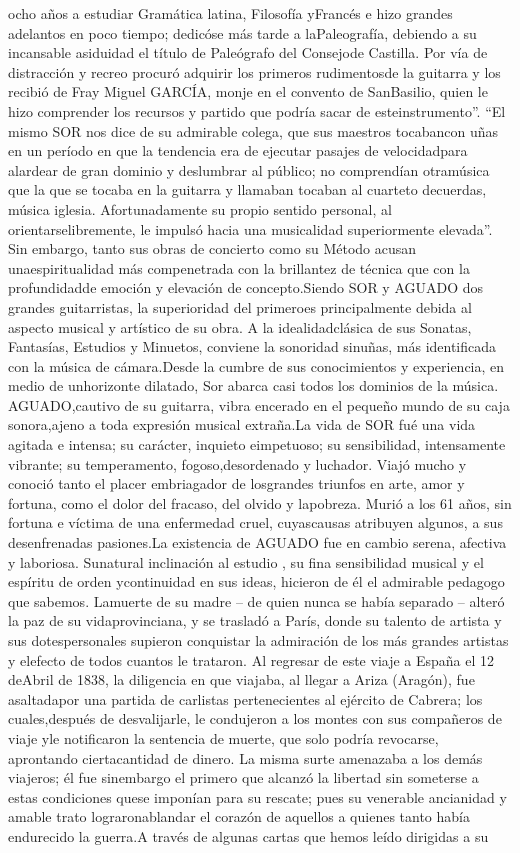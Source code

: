 \documentclass[
11pt, %
a4paper, %
oneside, %
headinclude,footinclude, %
BCOR5mm, %
]{scrartcl}
\begin{document}
{ocho años a estudiar Gramática latina, Filosofía yFrancés e hizo grandes adelantos en poco tiempo; dedicóse más tarde a laPaleografía, debiendo a su incansable asiduidad el título de Paleógrafo del Consejode Castilla. Por vía de distracción y recreo procuró adquirir los primeros rudimentosde la guitarra y los recibió de Fray Miguel GARCÍA, monje en el convento de SanBasilio, quien le hizo comprender los recursos y partido que podría sacar de esteinstrumento”. “El mismo SOR nos dice de su admirable colega, que sus maestros tocabancon uñas en un período en que la tendencia era de ejecutar pasajes de velocidadpara alardear de gran dominio y deslumbrar al público; no comprendían otramúsica que la que se tocaba en la guitarra y llamaban tocaban al cuarteto decuerdas, música iglesia. Afortunadamente su propio sentido personal, al orientarselibremente, le impulsó hacia una musicalidad superiormente elevada”. Sin embargo, tanto sus obras de concierto como su Método acusan unaespiritualidad más compenetrada con la brillantez de técnica que con la profundidadde emoción y elevación de concepto.Siendo SOR y AGUADO dos grandes guitarristas, la superioridad del primeroes principalmente debida al aspecto musical y artístico de su obra. A la idealidadclásica de sus Sonatas, Fantasías, Estudios y Minuetos, conviene la sonoridad sinuñas, más identificada con la música de cámara.Desde la cumbre de sus conocimientos y experiencia, en medio de unhorizonte dilatado, Sor abarca casi todos los dominios de la música. AGUADO,cautivo de su guitarra, vibra encerado en el pequeño mundo de su caja sonora,ajeno a toda expresión musical extraña.La vida de SOR fué una vida agitada e intensa; su carácter, inquieto eimpetuoso; su sensibilidad, intensamente vibrante; su temperamento, fogoso,desordenado y luchador. Viajó mucho y conoció tanto el placer embriagador de losgrandes triunfos en arte, amor y fortuna, como el dolor del fracaso, del olvido y lapobreza. Murió a los 61 años, sin fortuna e víctima de una enfermedad cruel, cuyascausas atribuyen algunos, a sus desenfrenadas pasiones.La existencia de AGUADO fue en cambio serena, afectiva y laboriosa. Sunatural inclinación al estudio , su fina sensibilidad musical y el espíritu de orden ycontinuidad en sus ideas, hicieron de él el admirable pedagogo que sabemos. Lamuerte de su madre – de quien nunca se había separado – alteró la paz de su vidaprovinciana, y se trasladó a París, donde su talento de artista y sus dotespersonales supieron conquistar la admiración de los más grandes artistas y elefecto de todos cuantos le trataron. Al regresar de este viaje a España el 12 deAbril de 1838, la diligencia en que viajaba, al llegar a Ariza (Aragón), fue asaltadapor una partida de carlistas pertenecientes al ejército de Cabrera; los cuales,después de desvalijarle, le condujeron a los montes con sus compañeros de viaje yle notificaron la sentencia de muerte, que solo podría revocarse, aprontando ciertacantidad de dinero. La misma surte amenazaba a los demás viajeros; él fue sinembargo el primero que alcanzó la libertad sin someterse a estas condiciones quese imponían para su rescate; pues su venerable ancianidad y amable trato lograronablandar el corazón de aquellos a quienes tanto había endurecido la guerra.A través de algunas cartas que hemos leído dirigidas a su }
\end{document}
